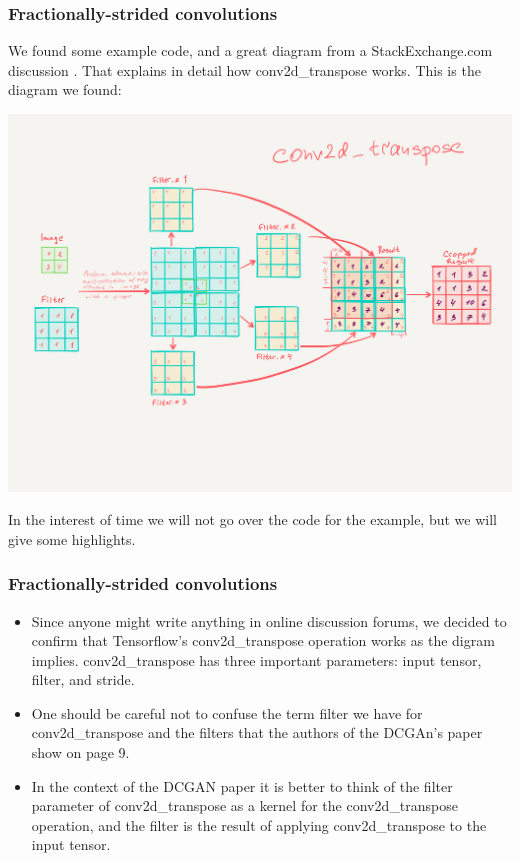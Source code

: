 \documentclass{beamer}
\begin{document}
\begin{frame}
\frametitle{Fractionally-strided convolutions}
We found some example code, and a great diagram from a StackExchange.com discussion 
\cite{stackExConv}. That explains in detail how conv2d\_transpose works.
This is the diagram we found:

\includegraphics[scale=0.25] {conv2d_transpose-example}


In the interest of time we will not go over the code for the example, but we
will give some highlights.

\end{frame}

\begin{frame}
\frametitle{Fractionally-strided convolutions}
\begin{itemize}
\item Since anyone might write anything in online discussion forums, we decided to 
confirm that Tensorflow's conv2d\_transpose operation works as the digram implies.
conv2d\_transpose has three important parameters: input tensor, 
filter, and stride. 

\item One should be careful not to confuse the term filter we
have for conv2d\_transpose and the filters that the authors of the DCGAn's paper
show on page 9. 

\item In the context of the DCGAN paper it is better to think of the filter
parameter of conv2d\_transpose  as a kernel for the conv2d\_transpose operation,
and the filter is the result of applying conv2d\_transpose to the input tensor. 
\end{itemize}
\end{frame}
\end{document}
